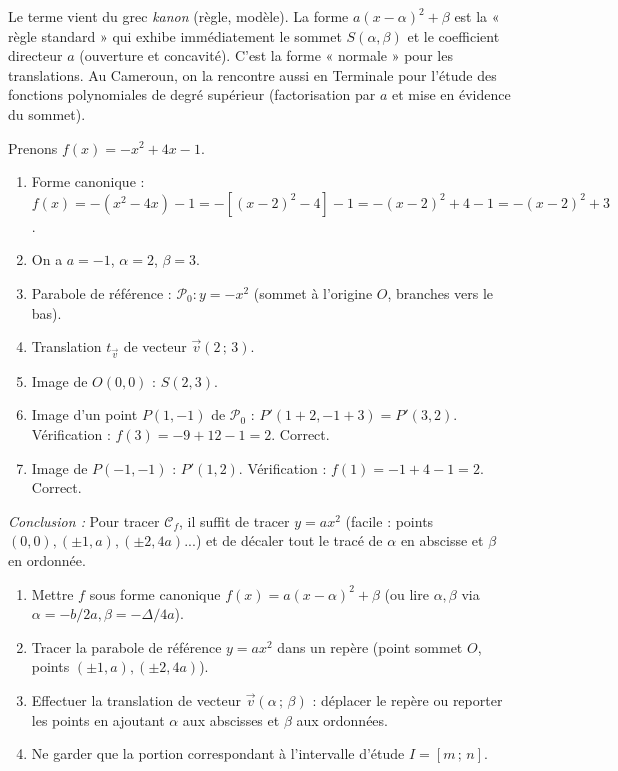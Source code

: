 \documentclass[11pt]{article}
\begin{document}
\begin{savaistu}
Le terme vient du grec \emph{kanon} (règle, modèle). La forme $a(x-\alpha)^2+\beta$ est la « règle standard » qui exhibe immédiatement le sommet $S(\alpha,\beta)$ et le coefficient directeur $a$ (ouverture et concavité). C'est la forme « normale » pour les translations. Au Cameroun, on la rencontre aussi en Terminale pour l'étude des fonctions polynomiales de degré supérieur (factorisation par $a$ et mise en évidence du sommet).
\end{savaistu}

\begin{experience}[Découverte : De $y=ax^2$ à $f(x)=a(x-\alpha)^2+\beta$ par translation]
Prenons $f(x) = -x^2 + 4x - 1$.
\begin{enumerate}
    \item Forme canonique : $f(x) = -(x^2 - 4x) - 1 = -[(x-2)^2 - 4] - 1 = -(x-2)^2 + 4 - 1 = -(x-2)^2 + 3$.
    \item On a $a=-1$, $\alpha=2$, $\beta=3$.
    \item Parabole de référence : $\mathcal{P}_0 : y = -x^2$ (sommet à l'origine $O$, branches vers le bas).
    \item Translation $t_{\vec{v}}$ de vecteur $\vec{v}(2\,;\,3)$.
    \item Image de $O(0,0)$ : $S(2,3)$.
    \item Image d'un point $P(1,-1)$ de $\mathcal{P}_0$ : $P'(1+2, -1+3) = P'(3,2)$. Vérification : $f(3) = -9+12-1=2$. Correct.
    \item Image de $P(-1,-1)$ : $P'(1,2)$. Vérification : $f(1) = -1+4-1=2$. Correct.
\end{enumerate}
\emph{Conclusion :} Pour tracer $\mathcal{C}_f$, il suffit de tracer $y=ax^2$ (facile : points $(0,0), (\pm 1, a), (\pm 2, 4a)$...) et de décaler tout le tracé de $\alpha$ en abscisse et $\beta$ en ordonnée.
\end{experience}

\begin{methode}
\begin{enumerate}
    \item Mettre $f$ sous forme canonique $f(x)=a(x-\alpha)^2+\beta$ (ou lire $\alpha, \beta$ via $\alpha=-b/2a, \beta=-\Delta/4a$).
    \item Tracer la parabole de référence $y=ax^2$ dans un repère (point sommet $O$, points $(\pm 1, a), (\pm 2, 4a)$).
    \item Effectuer la translation de vecteur $\vec{v}(\alpha\,;\,\beta)$ : déplacer le repère ou reporter les points en ajoutant $\alpha$ aux abscisses et $\beta$ aux ordonnées.
    \item Ne garder que la portion correspondant à l'intervalle d'étude $I=[m\,;\,n]$.
\end{enumerate}
\end{methode}
\end{document}
